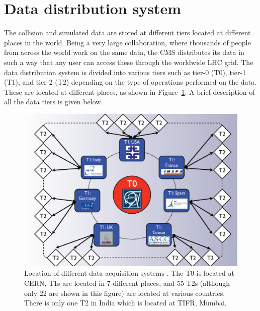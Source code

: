 
\section{Data distribution system}
The collision and simulated data are stored at different tiers located at 
different places in the world. Being a very large collaboration, where thousands
of people from across the world work on the same data, the CMS distributes 
its data in such a way that any user can access these through the worldwide
LHC grid. The data distribution system is divided into various tiers such as 
tier-0 (T0), tier-1 (T1), and tier-2 (T2) depending on the type of operations
performed on the data. These are located at different places, as shown in 
Figure~\ref{fig:data_tier}. A brief description of all the data tiers is 
given below.
\begin{figure}
  \begin{center}
  \includegraphics[width=0.70\linewidth]{Experiment/CMS/Image/data_tier.pdf}
	  \caption{Location of different data acquisition systems \cite{triDAS}.
	  The T0 is located at CERN, T1s are located in 7 different places,
	  and 55 T2s (although only 22 are shown in this figure) are located at 
	  various countries. There is only one T2 in India which is located at 
	  TIFR, Mumbai.}
  \label{fig:data_tier}
  \end{center}
\end{figure}

